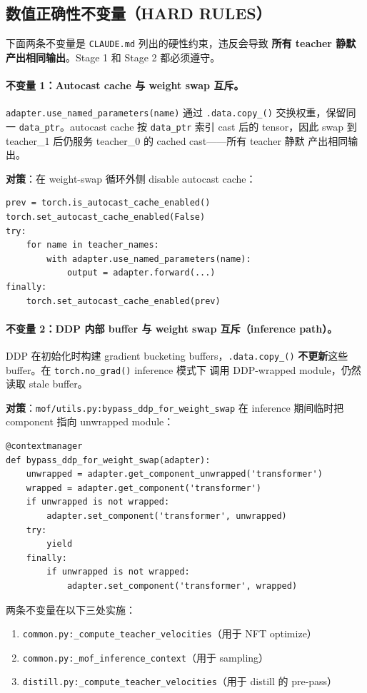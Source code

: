 \documentclass[11pt,a4paper]{article}
\theoremstyle{definition}
\begin{document}
\subsection{数值正确性不变量（HARD RULES）}
\label{subsec:invariants}

下面两条不变量是 \texttt{CLAUDE.md} 列出的硬性约束，违反会导致
\textbf{所有 teacher 静默产出相同输出}。Stage 1 和 Stage 2 都必须遵守。

\paragraph{不变量 1：Autocast cache 与 weight swap 互斥。}
\texttt{adapter.use\_named\_parameters(name)} 通过
\texttt{.data.copy\_()} 交换权重，保留同一 \texttt{data\_ptr}。autocast
cache 按 \texttt{data\_ptr} 索引 cast 后的 tensor，因此 swap 到
teacher\_1 后仍服务 teacher\_0 的 cached cast——所有 teacher 静默
产出相同输出。

\textbf{对策}：在 weight-swap 循环外侧 disable autocast cache：
\begin{verbatim}
prev = torch.is_autocast_cache_enabled()
torch.set_autocast_cache_enabled(False)
try:
    for name in teacher_names:
        with adapter.use_named_parameters(name):
            output = adapter.forward(...)
finally:
    torch.set_autocast_cache_enabled(prev)
\end{verbatim}

\paragraph{不变量 2：DDP 内部 buffer 与 weight swap 互斥（inference path）。}
DDP 在初始化时构建 gradient bucketing buffers，\texttt{.data.copy\_()}
\textbf{不更新}这些 buffer。在 \texttt{torch.no\_grad()} inference 模式下
调用 DDP-wrapped module，仍然读取 stale buffer。

\textbf{对策}：\texttt{mof/utils.py:bypass\_ddp\_for\_weight\_swap} 在
inference 期间临时把 component 指向 unwrapped module：
\begin{verbatim}
@contextmanager
def bypass_ddp_for_weight_swap(adapter):
    unwrapped = adapter.get_component_unwrapped('transformer')
    wrapped = adapter.get_component('transformer')
    if unwrapped is not wrapped:
        adapter.set_component('transformer', unwrapped)
    try:
        yield
    finally:
        if unwrapped is not wrapped:
            adapter.set_component('transformer', wrapped)
\end{verbatim}

两条不变量在以下三处实施：
\begin{enumerate}[leftmargin=1.5em]
\item \texttt{common.py:\_compute\_teacher\_velocities}（用于 NFT optimize）
\item \texttt{common.py:\_mof\_inference\_context}（用于 sampling）
\item \texttt{distill.py:\_compute\_teacher\_velocities}（用于 distill 的 pre-pass）
\end{enumerate}
\end{document}
